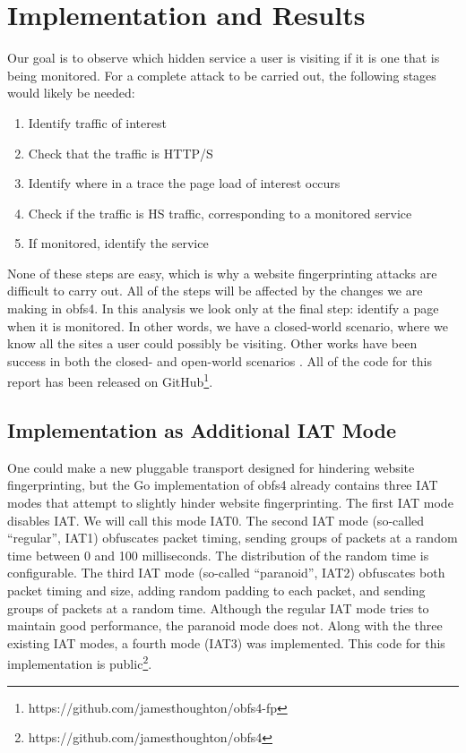 \documentclass[11pt]{article}
\begin{document}
\section{Implementation and Results}
Our goal is to observe which hidden service a user is visiting if it is one that is being monitored. For a complete attack to be carried out, the following stages would likely be needed:
\begin{enumerate}
    \item Identify traffic of interest
    \item Check that the traffic is HTTP/S
    \item Identify where in a trace the page load of interest occurs
    \item Check if the traffic is HS traffic, corresponding to a monitored service
    \item If monitored, identify the service
\end{enumerate}
None of these steps are easy, which is why a website fingerprinting attacks are difficult to carry out.
All of the steps will be affected by the changes we are making in obfs4.
In this analysis we look only at the final step: identify a page when it is monitored. In other words, we have a closed-world scenario, where we know all the sites a user could possibly be visiting.
Other works have been success in both the closed- and open-world scenarios \cite{hayes, wang, panchenko}.
All of the code for this report has been released on GitHub\footnote{https://github.com/jamesthoughton/obfs4-fp}.

\subsection{Implementation as Additional IAT Mode}
One could make a new pluggable transport designed for hindering website fingerprinting, but the Go implementation of obfs4 already contains three IAT modes that attempt to slightly hinder website fingerprinting. The first IAT mode disables IAT. We will call this mode IAT0. The second IAT mode (so-called ``regular'', IAT1) obfuscates packet timing, sending groups of packets at a random time between 0 and 100 milliseconds. The distribution of the random time is configurable. The third IAT mode (so-called ``paranoid'', IAT2) obfuscates both packet timing and size, adding random padding to each packet, and sending groups of packets at a random time. Although the regular IAT mode tries to maintain good performance, the paranoid mode does not. Along with the three existing IAT modes, a fourth mode (IAT3) was implemented. This code for this implementation is public\footnote{https://github.com/jamesthoughton/obfs4}.
\end{document}
